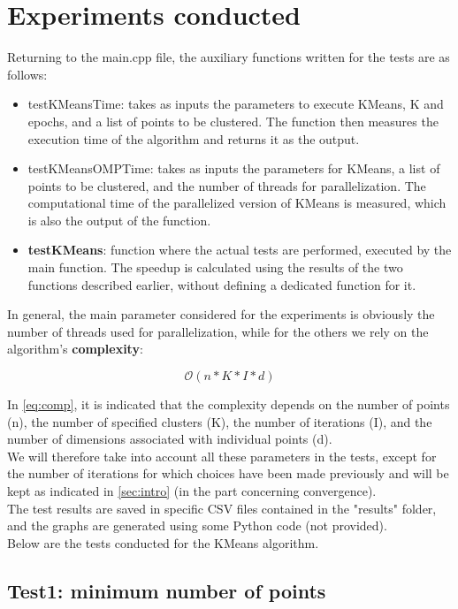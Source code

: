 \documentclass[10pt,twocolumn,letterpaper]{article}
\newcommand{\bit} {\begin{itemize} }
\newcommand{\eit} {\end{itemize} }
\begin{document}
\section{Experiments conducted}
\label{sec:exp}

Returning to the main.cpp file, the auxiliary functions written for the tests are as follows:

\bit
    \item{testKMeansTime: takes as inputs the parameters to execute KMeans, K and epochs, and a list of points to be clustered. The function then measures the execution time of the algorithm and returns it as the output.}
    \item{testKMeansOMPTime: takes as inputs the parameters for KMeans, a list of points to be clustered, and the number of threads for parallelization. The computational time of the parallelized version of KMeans is measured, which is also the output of the function.}
    \item{\textbf{testKMeans}: function where the actual tests are performed, executed by the main function. The speedup is calculated using the results of the two functions described earlier, without defining a dedicated function for it.}
\eit

In general, the main parameter considered for the experiments is obviously the number of threads used for parallelization, while for the others we rely on the algorithm's \textbf{complexity}:

\begin{equation}
\label{eq:comp}
    \mathcal{O}(n * K * I * d)
\end{equation}

In \cref{eq:comp}, it is indicated that the complexity depends on the number of points (n), the number of specified clusters (K), the number of iterations (I), and the number of dimensions associated with individual points (d).\\
We will therefore take into account all these parameters in the tests, except for the number of iterations for which choices have been made previously and will be kept as indicated in \cref{sec:intro} (in the part concerning convergence).\\
The test results are saved in specific CSV files contained in the "results" folder, and the graphs are generated using some Python code (not provided).\\
Below are the tests conducted for the KMeans algorithm.

\subsection{Test1: minimum number of points}
\label{sec:t1}
\end{document}
